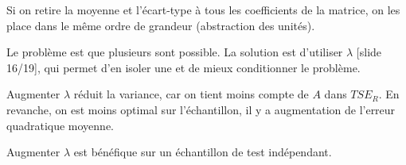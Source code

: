 		Si on retire la moyenne et l'écart-type à tous les coefficients de la matrice, on les place dans le même ordre de grandeur (abstraction des unités).
		
		
		Le problème est que plusieurs sont possible. La solution est d'utiliser $\lambda$ [slide 16/19], qui permet d'en isoler une et de mieux conditionner le problème.
		
		Augmenter $\lambda$ réduit la variance, car on tient moins compte de $A$ dans $TSE_R$. En revanche, on est moins optimal sur l'échantillon, il y a augmentation de l'erreur quadratique moyenne.
		
		
		Augmenter $\lambda$ est bénéfique sur un échantillon de test indépendant.
		
		
		
		
		
		
		
		
